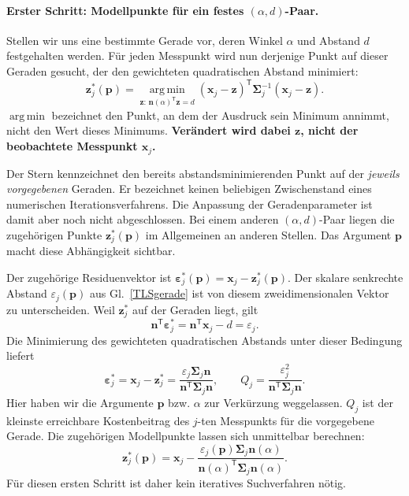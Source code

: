 \paragraph{Erster Schritt: Modellpunkte für ein festes $(\alpha,d)$-Paar.}
Stellen wir uns eine bestimmte Gerade vor, deren Winkel $\alpha$ und
Abstand $d$ festgehalten werden. Für jeden Messpunkt wird nun derjenige
Punkt auf dieser Geraden gesucht, der den gewichteten quadratischen
Abstand minimiert:
\begin{equation}
\mathbf{z}_j^*(\mathbf{p})
=\underset{\mathbf{z}:\,\mathbf{n}(\alpha)^\mathsf{T}\mathbf{z}=d}
{\operatorname{arg\,min}}
(\mathbf{x}_j-\mathbf{z})^\mathsf{T}
\boldsymbol{\Sigma}_j^{-1}(\mathbf{x}_j-\mathbf{z}).
\label{V4GeradeModellpunkt}
\end{equation}
$\operatorname{arg\,min}$ bezeichnet den Punkt, an dem der Ausdruck
sein Minimum annimmt, nicht den Wert dieses Minimums.
\textbf{Verändert wird dabei $\mathbf{z}$, nicht der beobachtete
Messpunkt $\mathbf{x}_j$.}

Der Stern kennzeichnet den bereits abstandsminimierenden Punkt auf
der \emph{jeweils vorgegebenen} Geraden. Er bezeichnet keinen beliebigen
Zwischenstand eines numerischen Iterationsverfahrens. Die Anpassung
der Geradenparameter ist damit aber noch nicht abgeschlossen.
Bei einem anderen $(\alpha,d)$-Paar liegen die zugehörigen Punkte
$\mathbf{z}_j^*(\mathbf{p})$ im Allgemeinen an anderen Stellen.
Das Argument $\mathbf{p}$ macht diese Abhängigkeit sichtbar.

Der zugehörige Residuenvektor ist
$\boldsymbol{\varepsilon}_j^*(\mathbf{p})
=\mathbf{x}_j-\mathbf{z}_j^*(\mathbf{p})$.
Der skalare senkrechte Abstand $\varepsilon_j(\mathbf{p})$ aus
Gl.~\eqref{TLSgerade} ist von diesem zweidimensionalen Vektor zu
unterscheiden. Weil $\mathbf{z}_j^*$ auf der Geraden liegt, gilt
\[
\mathbf{n}^\mathsf{T}\boldsymbol{\varepsilon}_j^*
=\mathbf{n}^\mathsf{T}\mathbf{x}_j-d=\varepsilon_j.
\]
Die Minimierung des gewichteten quadratischen Abstands unter dieser
Bedingung liefert
\begin{equation}
\boldsymbol{\varepsilon}_j^*=\mathbf{x}_j-\mathbf{z}_j^*
=\frac{\varepsilon_j\boldsymbol{\Sigma}_j\mathbf{n}}
{\mathbf{n}^\mathsf{T}\boldsymbol{\Sigma}_j\mathbf{n}},
\qquad
Q_j=\frac{\varepsilon_j^2}
{\mathbf{n}^\mathsf{T}\boldsymbol{\Sigma}_j\mathbf{n}}.
\label{KonzepteGewichteteProjektion}
\end{equation}
Hier haben wir die Argumente $\mathbf{p}$ bzw. $\alpha$ zur Verkürzung
weggelassen. $Q_j$ ist der kleinste erreichbare Kostenbeitrag des
$j$-ten Messpunkts für die vorgegebene Gerade. Die zugehörigen
Modellpunkte lassen sich unmittelbar berechnen:
\[
\mathbf{z}_j^*(\mathbf{p})
=\mathbf{x}_j-
\frac{\varepsilon_j(\mathbf{p})\boldsymbol{\Sigma}_j\mathbf{n}(\alpha)}
{\mathbf{n}(\alpha)^\mathsf{T}\boldsymbol{\Sigma}_j\mathbf{n}(\alpha)}.
\]
Für diesen ersten Schritt ist daher kein iteratives Suchverfahren nötig.

